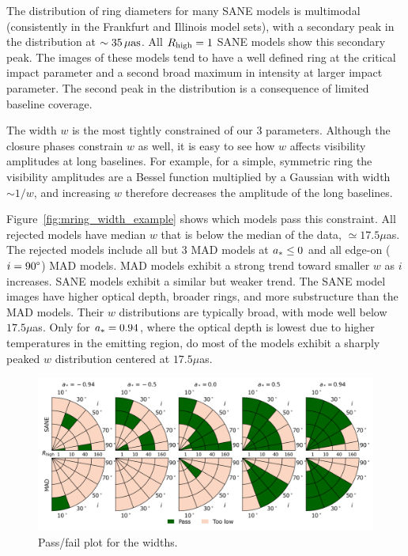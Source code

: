 The distribution of ring diameters for many SANE models is multimodal (consistently in the Frankfurt and Illinois model sets), with a secondary peak in the distribution at $\sim 35\,\mathrm{\mu as}$.  All $R_\mathrm{high} = 1$ SANE models show this secondary peak.  The images of these models tend to have a well defined ring at the critical impact parameter and a second broad maximum in intensity at larger impact parameter.  The second peak in the distribution is a consequence of limited baseline coverage.


The \mring width $w$ is the most tightly constrained of our 3 parameters. Although the closure phases constrain $w$ as well, it is easy to see how $w$ affects visibility amplitudes at long baselines. For example, for a simple, symmetric ring the visibility amplitudes are a Bessel function multiplied by a Gaussian with width $\sim 1/w$, and increasing $w$ therefore decreases the amplitude of the long baselines.

Figure~\ref{fig:mring_width_example} shows which models pass this constraint. All rejected models have median $w$ that is below the median of the data, $ \simeq 17.5\mu$as. The rejected models include all but 3 MAD models at $a_* \le 0$ and all edge-on ($i = 90\degree$) MAD models.  MAD models exhibit a strong trend toward smaller $w$ as $i$ increases.  SANE models exhibit a similar but weaker trend. The SANE model images have  higher optical depth, broader rings, and more substructure than the MAD models.  Their $w$ distributions are typically broad, with mode well below $17.5\mu$as.  Only for $a_* = 0.94$, where the optical depth is lowest due to higher temperatures in the emitting region, do most of the models exhibit a sharply peaked $w$ distribution centered at $17.5\mu$as.

\begin{figure}
 \centering
 \includegraphics[width=\textwidth]{./figures/Mring_w_Constraints.png}
  \caption{Pass/fail plot for the \mring widths.}
\end{figure}

